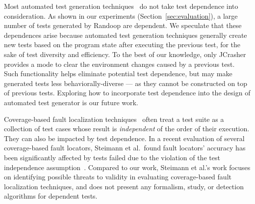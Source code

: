 

Most automated test generation
techniques~\cite{PachecoLET2007, Wang:2007:AGC, RobinsonEPAL2011
ZhangSBE2011} do not take test dependence
into consideration. As shown in our experiments (Section~\ref{sec:evaluation}),
a large number of tests generated by Randoop are dependent.
We speculate that these dependences arise because automated
test generation techniques generally create new tests
based on the program state after executing the previous test,
for the sake of test diversity and efficiency. 
To the best of our knowledge, only JCrasher~\cite{Csallner:2004}
provides a mode to clear the environment changes caused
by a previous test. Such functionality helps eliminate
potential test dependence, but may make generated
tests less behaviorally-diverse --- as they cannot be constructed
on top of previous tests. Exploring how to
incorporate test dependence into the design of automated
test generator is our future work.

Coverage-based fault localization techniques~\cite{Jones:2002:VTI}
often treat a test suite as a collection of test cases
whose result is \textit{independent} of the order of their
execution. They can also be impacted by test dependence.
In a recent evaluation of several coverage-based fault locators,
 Steimann et al.\ found fault locators' accuracy has been significantly
 affected by tests failed due to the violation of the test
 independence assumption~\cite{Steimann:2013}. 
 Compared to our work, Steimann et al.'s
 work focuses on identifying possible threats to validity
 in evaluating coverage-based fault localization techniques, and does
 not present any formalism, study, or detection algorithms
 for dependent tests.


